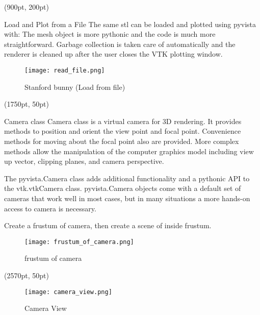 \documentclass[final]{beamer}
\begin{document}
\begin{frame}
\begin{textblock*}{800pt}(900pt, 200pt)
\begin{block}{Load and Plot from a File}
The same stl can be loaded and plotted using pyvista with:
The mesh object is more pythonic and the code is much more straightforward.
Garbage collection is taken care of automatically and the renderer is cleaned up after the user closes the VTK plotting window.

\begin{figure}
\texttt{[image: read\_file.png]}
\caption{Stanford bunny (Load from file)}
\end{figure}
\end{block}
\end{textblock*}

\begin{textblock*}{800pt}(1750pt, 50pt)
\begin{block}{Camera class}
Camera class is a virtual camera for 3D rendering.
It provides methods to position and orient the view point and focal point.
Convenience methods for moving about the focal point also are provided.
More complex methods allow the manipulation of the computer graphics model including view up vector, clipping planes, and camera perspective.

The pyvista.Camera class adds additional functionality and a pythonic API to the vtk.vtkCamera class.
pyvista.Camera objects come with a default set of cameras that work well in most cases,
but in many situations a more hands-on access to camera is necessary.

Create a frustum of camera, then create a scene of inside frustum.

\begin{figure}
\texttt{[image: frustum\_of\_camera.png]}
\caption{frustum of camera}
\end{figure}
\end{block}
\end{textblock*}

\begin{textblock*}{800pt}(2570pt, 50pt)

\begin{figure}
\texttt{[image: camera\_view.png]}
\caption{Camera View}
\end{figure}
\end{textblock*}


\end{frame}
\end{document}
